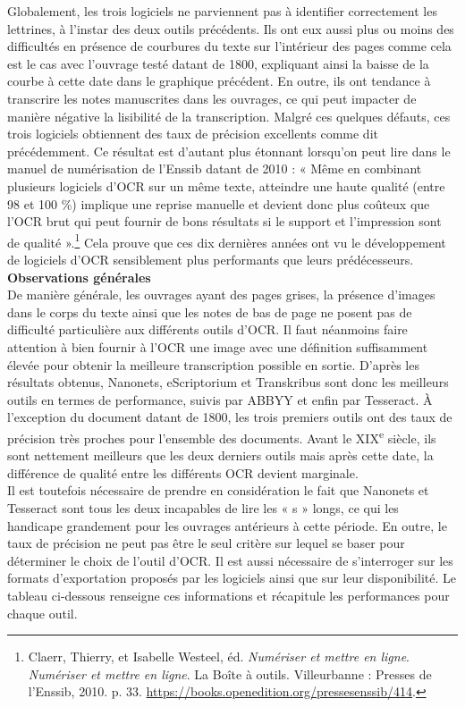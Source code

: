 \documentclass[a4paper,12pt,twoside]{book}
\begin{document}
Globalement, les trois logiciels ne parviennent pas à identifier
correctement les lettrines, à l'instar des deux outils précédents. Ils
ont eux aussi plus ou moins des difficultés en présence de courbures du
texte sur l'intérieur des pages comme cela est le cas avec l'ouvrage
testé datant de 1800, expliquant ainsi la baisse de la courbe à cette
date dans le graphique précédent. En outre, ils ont tendance à
transcrire les notes manuscrites dans les ouvrages, ce qui peut impacter
de manière négative la lisibilité de la transcription. Malgré ces
quelques défauts, ces trois logiciels obtiennent des taux de précision
excellents comme dit précédemment. Ce résultat est d'autant plus
étonnant lorsqu'on peut lire dans le manuel de numérisation de l'Enssib
datant de 2010 : « Même en combinant plusieurs logiciels d'OCR sur un
même texte, atteindre une haute qualité (entre 98 et 100 \%) implique
une reprise manuelle et devient donc plus coûteux que l'OCR brut qui
peut fournir de bons résultats si le support et l'impression sont de
qualité ».\footnote{Claerr, Thierry, et Isabelle Westeel, éd.
	\emph{Numériser et mettre en ligne}. \emph{Numériser et mettre en
		ligne}. La Boîte à outils. Villeurbanne : Presses de l'Enssib, 2010. p. 33.
	\url{https://books.openedition.org/pressesenssib/414}.} Cela prouve
que ces dix dernières années ont vu le développement de logiciels d'OCR
sensiblement plus performants que leurs prédécesseurs. \\

\textbf{Observations générales} \\

De manière générale, les ouvrages ayant des pages grises, la présence
d'images dans le corps du texte ainsi que les notes de
bas de page ne posent pas de difficulté particulière aux différents
outils d'OCR. Il faut néanmoins faire attention à bien fournir à l'OCR
une image avec une définition suffisamment élevée pour obtenir la
meilleure transcription possible en sortie. D'après les résultats
obtenus, Nanonets, eScriptorium et Transkribus sont donc les meilleurs
outils en termes de performance, suivis par ABBYY et enfin par
Tesseract. À l'exception du document datant de 1800, les trois premiers
outils ont des taux de précision très proches pour l'ensemble des
documents. Avant le XIX\textsuperscript{e} siècle, ils sont nettement
meilleurs que les deux derniers outils mais après cette date, la
différence de qualité entre les différents OCR devient marginale. \\

Il est toutefois nécessaire de prendre en considération le fait que
Nanonets et Tesseract sont tous les deux incapables de lire les « s »
longs, ce qui les handicape grandement pour les ouvrages antérieurs à
cette période. En outre, le taux de précision ne peut pas être le seul
critère sur lequel se baser pour déterminer le choix de l'outil d'OCR.
Il est aussi nécessaire de s'interroger sur les formats d'exportation
proposés par les logiciels ainsi que sur leur disponibilité. Le tableau
ci-dessous renseigne ces informations et récapitule les performances
pour chaque outil. \\
\end{document}
